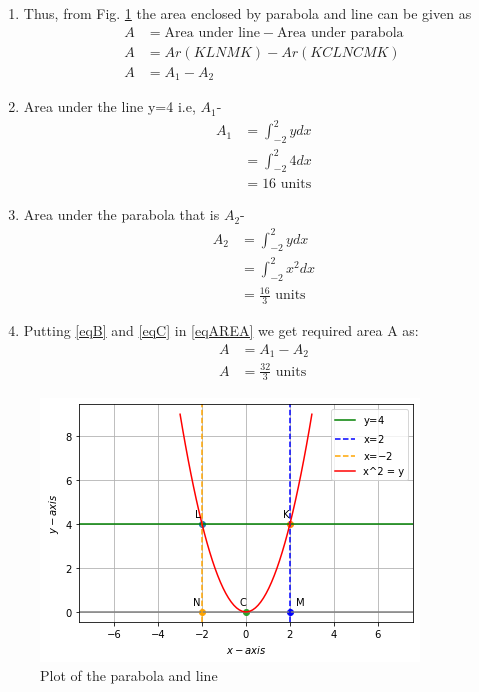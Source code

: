 \documentclass[journal,12pt,twocolumn]{IEEEtran}
\begin{document}
\begin{enumerate}
  \item Thus, from Fig. \ref{Plot of the Parabola and line} the area enclosed by parabola and line can be given as
\begin{align}
   A&= \text{Area under line} - \text{Area under parabola}
     \\
   A&= Ar(KLNMK)-Ar(KCLNCMK)
    \\
    A&= A_{1} -A_{2} \label{eqAREA}
    \end{align}
\item Area under the line y=4 i.e, $A_1$-
\begin{align}
  A_{1}&= \int_{-2}^{2} y dx
    \\
   &= \int_{-2}^{2} 4 dx
     \\
    &=16 \text{ units} \label{eqB}
\end{align}
\item Area under the parabola that is $A_2$-
\begin{align}
    A_{2}&= \int_{-2}^{2} y dx
    \\
    &= \int_{-2}^{2} x^{2} dx
    \\
    &= \frac{16}{3} \text{ units} \label{eqC}
\end{align}
\item Putting \eqref{eqB} and \eqref{eqC} in \eqref{eqAREA} we get required area A as:
\begin{align}
 A &= A_{1} -A_{2} 
 \\
 A &= \frac{32}{3} \text{ units}
\end{align}
%
\end{enumerate}
\begin{figure}[ht]
\centering
\includegraphics[width=\columnwidth]{fig_A_5.png}
\caption{Plot of the parabola and line}
\label{Plot of the Parabola and line}
\end{figure}
\end{document}
